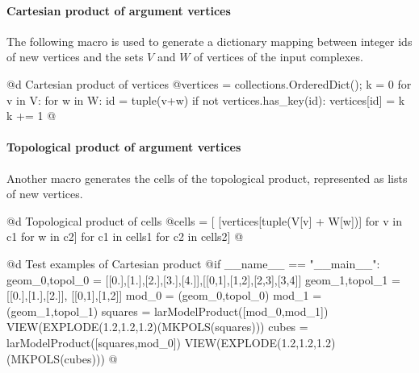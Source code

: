 \documentclass[11pt,oneside]{article}	%
\begin{document}
\paragraph{Cartesian product of argument vertices}
The following macro is used to generate a dictionary mapping between integer ids of new vertices and the sets $V$ and $W$ of vertices of the input complexes.

@d Cartesian product of vertices  
@{vertices = collections.OrderedDict(); k = 0
for v in V:
    for w in W:
        id = tuple(v+w)
        if not vertices.has_key(id):
            vertices[id] = k
            k += 1	@}


\paragraph{Topological product of argument vertices}
Another macro generates the cells of the topological product, represented as lists of new vertices. 

@d Topological product of cells    
@{cells = [ [vertices[tuple(V[v] + W[w])] for v in c1 for w in c2]
         for c1 in cells1 for c2 in cells2]	@}


@d Test examples of Cartesian product
@{if __name__ == "__main__":
    geom_0,topol_0 = [[0.],[1.],[2.],[3.],[4.]],[[0,1],[1,2],[2,3],[3,4]]
    geom_1,topol_1 = [[0.],[1.],[2.]], [[0,1],[1,2]]
    mod_0 = (geom_0,topol_0)
    mod_1 = (geom_1,topol_1)
    squares = larModelProduct([mod_0,mod_1])
    VIEW(EXPLODE(1.2,1.2,1.2)(MKPOLS(squares)))
    cubes = larModelProduct([squares,mod_0])
    VIEW(EXPLODE(1.2,1.2,1.2)(MKPOLS(cubes)))
@}
\end{document}
